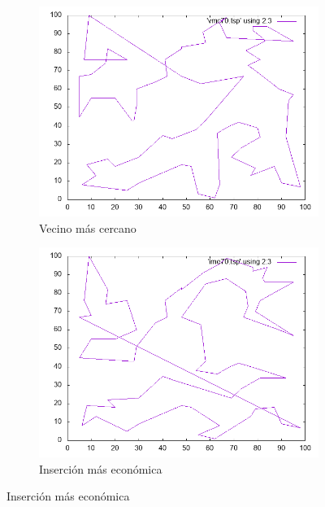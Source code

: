 \documentclass[12pt,spanish]{article}
\begin{document}
\begin{figure}[H]
\centering
\begin{subfigure}[b]{0.36\textwidth}
\includegraphics[width=\textwidth]{st70_vmc.png}
\caption{Vecino más cercano}
\end{subfigure}
\quad
\begin{subfigure}[b]{0.36\textwidth}
\includegraphics[width=\textwidth]{st70_ime.png}
\caption{Inserción más económica}
\end{subfigure}

\vspace{1cm}


\end{figure}
\end{document}
